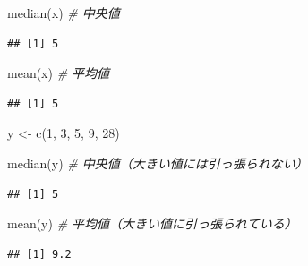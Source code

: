 \documentclass[
  12pt,
]{book}
\newenvironment{Shaded}{\begin{snugshade}}{\end{snugshade}}
\newcommand{\CommentTok}[1]{\textcolor[rgb]{0.56,0.35,0.01}{\textit{#1}}}
\newcommand{\DecValTok}[1]{\textcolor[rgb]{0.00,0.00,0.81}{#1}}
\newcommand{\FunctionTok}[1]{\textcolor[rgb]{0.00,0.00,0.00}{#1}}
\newcommand{\NormalTok}[1]{#1}
\newcommand{\OtherTok}[1]{\textcolor[rgb]{0.56,0.35,0.01}{#1}}
\begin{document}
\begin{Shaded}
\begin{Highlighting}[numbers=left,,]
\FunctionTok{median}\NormalTok{(x)                    }\CommentTok{\# 中央値}
\end{Highlighting}
\end{Shaded}

\begin{verbatim}
## [1] 5
\end{verbatim}

\begin{Shaded}
\begin{Highlighting}[numbers=left,,]
\FunctionTok{mean}\NormalTok{(x)                      }\CommentTok{\# 平均値}
\end{Highlighting}
\end{Shaded}

\begin{verbatim}
## [1] 5
\end{verbatim}

\begin{Shaded}
\begin{Highlighting}[numbers=left,,]
\NormalTok{y }\OtherTok{\textless{}{-}} \FunctionTok{c}\NormalTok{(}\DecValTok{1}\NormalTok{, }\DecValTok{3}\NormalTok{, }\DecValTok{5}\NormalTok{, }\DecValTok{9}\NormalTok{, }\DecValTok{28}\NormalTok{)}
\end{Highlighting}
\end{Shaded}

\begin{Shaded}
\begin{Highlighting}[numbers=left,,]
\FunctionTok{median}\NormalTok{(y)                    }\CommentTok{\# 中央値（大きい値には引っ張られない）}
\end{Highlighting}
\end{Shaded}

\begin{verbatim}
## [1] 5
\end{verbatim}

\begin{Shaded}
\begin{Highlighting}[numbers=left,,]
\FunctionTok{mean}\NormalTok{(y)                      }\CommentTok{\# 平均値（大きい値に引っ張られている）}
\end{Highlighting}
\end{Shaded}

\begin{verbatim}
## [1] 9.2
\end{verbatim}
\end{document}
